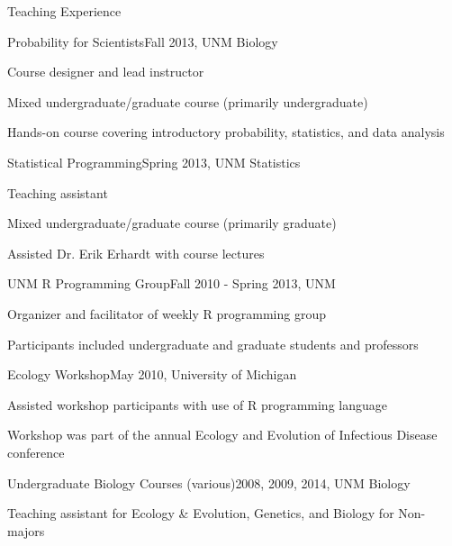 \documentclass{resume} %
\begin{document}
\begin{rSection}{Teaching Experience}
\begin{rSubsection}{Probability for Scientists}{Fall 2013, UNM Biology}{}{}
\item Course designer and lead instructor
\item Mixed undergraduate/graduate course (primarily undergraduate)
\item Hands-on course covering introductory probability, statistics, and data analysis
\end{rSubsection}
\begin{rSubsection}{Statistical Programming}{Spring 2013, UNM Statistics}{}{}
\item Teaching assistant
\item Mixed undergraduate/graduate course (primarily graduate)
\item Assisted Dr. Erik Erhardt with course lectures
\end{rSubsection}
\begin{rSubsection}{UNM R Programming Group}{Fall 2010 - Spring 2013, UNM}{}{}
\item Organizer and facilitator of weekly R programming group
\item Participants included undergraduate and graduate students and professors
\end{rSubsection}
\begin{rSubsection}{Ecology Workshop}{May 2010, University of Michigan}{}{}
\item Assisted workshop participants with use of R programming language
\item Workshop was part of the annual Ecology and Evolution of Infectious
Disease conference
\end{rSubsection}
\begin{rSubsection}{Undergraduate Biology Courses (various)}{2008, 2009, 2014, UNM Biology}{}{}
\item Teaching assistant for Ecology \& Evolution, Genetics, and Biology for
Non-majors
\end{rSubsection}
\end{rSection}

\end{document}
